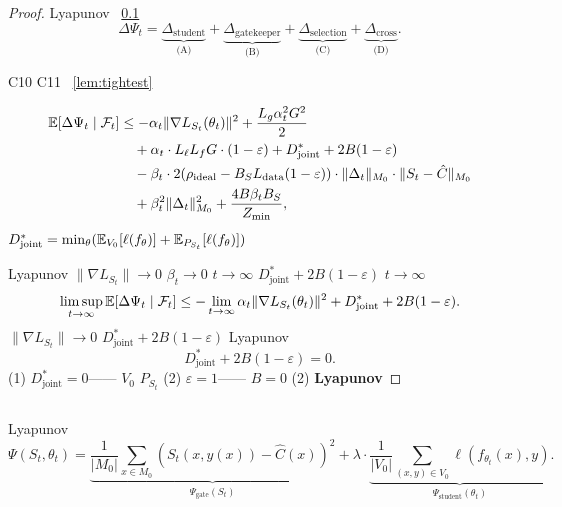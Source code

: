 \begin{proof}
 Lyapunov ~\ref{sec:decomp} 
\begin{equation}
    \Delta\Psi_t = \underbrace{\Delta_{\text{student}}}_{\text{(A)}} + \underbrace{\Delta_{\text{gatekeeper}}}_{\text{(B)}} + \underbrace{\Delta_{\text{selection}}}_{\text{(C)}} + \underbrace{\Delta_{\text{cross}}}_{\text{(D)}}.
\end{equation}

 C10  C11 ~\ref{lem:tightest} 

\begin{align}
    \mathbb{E}[\Delta\Psi_t \mid \mathcal{F}_t] &\leq -\alpha_t \|\nabla L_{S_t}(\theta_t)\|^2 + \frac{L_g \alpha_t^2 G^2}{2} \notag\\
    &\quad + \alpha_t \cdot L_\ell L_f G \cdot (1 - \varepsilon) + D_{\text{joint}}^* + 2B(1-\varepsilon) \notag\\
    &\quad - \beta_t \cdot 2(\rho_{\text{ideal}} - B_S L_{\text{data}}(1-\varepsilon)) \cdot \|\Delta_t\|_{M_0} \cdot \|S_t - \hat{C}\|_{M_0} \notag\\
    &\quad + \beta_t^2 \|\Delta_t\|_{M_0}^2 + \frac{4B \beta_t B_S}{Z_{\min}},
\end{align}
 $D_{\text{joint}}^* = \min_\theta (\mathbb{E}_{V_0}[\ell(f_\theta)] + \mathbb{E}_{P_{S_t}}[\ell(f_\theta)])$ 

Lyapunov  $\|\nabla L_{S_t}\| \to 0$  $\beta_t \to 0$  $t \to \infty$ $D_{\text{joint}}^* + 2B(1-\varepsilon)$ \textbf{} $t \to \infty$
\begin{equation}
    \limsup_{t \to \infty} \mathbb{E}[\Delta\Psi_t \mid \mathcal{F}_t] \leq -\lim_{t \to \infty} \alpha_t \|\nabla L_{S_t}(\theta_t)\|^2 + D_{\text{joint}}^* + 2B(1-\varepsilon).
\end{equation}
$\|\nabla L_{S_t}\| \to 0$ $D_{\text{joint}}^* + 2B(1-\varepsilon)$ Lyapunov 
\begin{equation}
    D_{\text{joint}}^* + 2B(1-\varepsilon) = 0.
\end{equation}
(1) $D_{\text{joint}}^* = 0$—— $V_0$  $P_{S_t}$  (2)  $\varepsilon = 1$—— $B = 0$ (2) \textbf{Lyapunov }
\end{proof}

\subsection{}\label{sec:decomp}

 Lyapunov 
\begin{equation}\label{eq:lyapunov-full-def}
    \Psi(S_t, \theta_t) = \underbrace{\frac{1}{|M_0|} \sum_{x \in M_0} (S_t(x, y(x)) - \hat{C}(x))^2}_{\Psi_{\text{gate}}(S_t)} + \lambda \cdot \underbrace{\frac{1}{|V_0|} \sum_{(x,y) \in V_0} \ell(f_{\theta_t}(x), y)}_{\Psi_{\text{student}}(\theta_t)}.
\end{equation}

